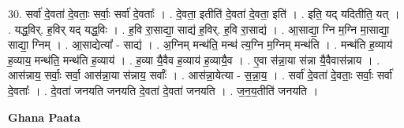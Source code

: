 \documentclass[17pt]{extarticle}
\begin{document}
30. सर्वा॑ दे॒वता॑ दे॒वताः॒ सर्वाः॒ सर्वा॑ दे॒वताः᳚ । . दे॒वता॒ इतीति॑ दे॒वता॑ दे॒वता॒ इति॑ । . इति॒ यद् यदितीति॒ यत् । . यद्ध॒विर्. ह॒विर् यद् यद्ध॒विः । . ह॒वि रा॒साद्या॒ साद्य॑ ह॒विर्. ह॒वि रा॒साद्य॑ । . आ॒साद्या॒ ग्नि म॒ग्नि मा॒साद्या॒ साद्या॒ ग्निम् । . आ॒साद्येत्या᳚ - साद्य॑ । . अ॒ग्निम् मन्थ॑ति॒ मन्थ॑ त्य॒ग्नि म॒ग्निम् मन्थ॑ति । . मन्थ॑ति ह॒व्याय॑ ह॒व्याय॒ मन्थ॑ति॒ मन्थ॑ति ह॒व्याय॑ । . ह॒व्या यै॒वैव ह॒व्याय॑ ह॒व्यायै॒व । . ए॒वा स॑न्ना॒या स॑न्ना यै॒वैवास॑न्नाय । . आस॑न्नाय॒ सर्वाः॒ सर्वा॒ आस॑न्ना॒या स॑न्नाय॒ सर्वाः᳚ । . आस॑न्ना॒येत्या - स॒न्ना॒य॒ । . सर्वा॑ दे॒वता॑ दे॒वताः॒ सर्वाः॒ सर्वा॑ दे॒वताः᳚ । . दे॒वता॑ जनयति जनयति दे॒वता॑ दे॒वता॑ जनयति । . ज॒न॒य॒तीति॑ जनयति । \newline

\textbf{Ghana Paata } \newline
\end{document}
